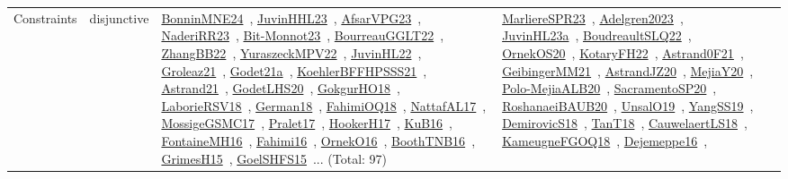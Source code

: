 {\begin{longtable}{lp{3cm}>{\raggedright\arraybackslash}p{6cm}>{\raggedright\arraybackslash}p{6cm}>{\raggedright\arraybackslash}p{8cm}}
Constraints & disjunctive & \href{../works/BonninMNE24.pdf}{BonninMNE24}~\cite{BonninMNE24}, \href{../works/JuvinHHL23.pdf}{JuvinHHL23}~\cite{JuvinHHL23}, \href{../works/AfsarVPG23.pdf}{AfsarVPG23}~\cite{AfsarVPG23}, \href{../works/NaderiRR23.pdf}{NaderiRR23}~\cite{NaderiRR23}, \href{../works/Bit-Monnot23.pdf}{Bit-Monnot23}~\cite{Bit-Monnot23}, \href{../works/BourreauGGLT22.pdf}{BourreauGGLT22}~\cite{BourreauGGLT22}, \href{../works/ZhangBB22.pdf}{ZhangBB22}~\cite{ZhangBB22}, \href{../works/YuraszeckMPV22.pdf}{YuraszeckMPV22}~\cite{YuraszeckMPV22}, \href{../works/JuvinHL22.pdf}{JuvinHL22}~\cite{JuvinHL22}, \href{../works/Groleaz21.pdf}{Groleaz21}~\cite{Groleaz21}, \href{../works/Godet21a.pdf}{Godet21a}~\cite{Godet21a}, \href{../works/KoehlerBFFHPSSS21.pdf}{KoehlerBFFHPSSS21}~\cite{KoehlerBFFHPSSS21}, \href{../works/Astrand21.pdf}{Astrand21}~\cite{Astrand21}, \href{../works/GodetLHS20.pdf}{GodetLHS20}~\cite{GodetLHS20}, \href{../works/GokgurHO18.pdf}{GokgurHO18}~\cite{GokgurHO18}, \href{../works/LaborieRSV18.pdf}{LaborieRSV18}~\cite{LaborieRSV18}, \href{../works/German18.pdf}{German18}~\cite{German18}, \href{../works/FahimiOQ18.pdf}{FahimiOQ18}~\cite{FahimiOQ18}, \href{../works/NattafAL17.pdf}{NattafAL17}~\cite{NattafAL17}, \href{../works/MossigeGSMC17.pdf}{MossigeGSMC17}~\cite{MossigeGSMC17}, \href{../works/Pralet17.pdf}{Pralet17}~\cite{Pralet17}, \href{../works/HookerH17.pdf}{HookerH17}~\cite{HookerH17}, \href{../works/KuB16.pdf}{KuB16}~\cite{KuB16}, \href{../works/FontaineMH16.pdf}{FontaineMH16}~\cite{FontaineMH16}, \href{../works/Fahimi16.pdf}{Fahimi16}~\cite{Fahimi16}, \href{../works/OrnekO16.pdf}{OrnekO16}~\cite{OrnekO16}, \href{../works/BoothTNB16.pdf}{BoothTNB16}~\cite{BoothTNB16}, \href{../works/GrimesH15.pdf}{GrimesH15}~\cite{GrimesH15}, \href{../works/GoelSHFS15.pdf}{GoelSHFS15}~\cite{GoelSHFS15}... (Total: 97) & \href{../works/MarliereSPR23.pdf}{MarliereSPR23}~\cite{MarliereSPR23}, \href{../works/Adelgren2023.pdf}{Adelgren2023}~\cite{Adelgren2023}, \href{../works/JuvinHL23a.pdf}{JuvinHL23a}~\cite{JuvinHL23a}, \href{../works/BoudreaultSLQ22.pdf}{BoudreaultSLQ22}~\cite{BoudreaultSLQ22}, \href{../works/OrnekOS20.pdf}{OrnekOS20}~\cite{OrnekOS20}, \href{../works/KotaryFH22.pdf}{KotaryFH22}~\cite{KotaryFH22}, \href{../works/Astrand0F21.pdf}{Astrand0F21}~\cite{Astrand0F21}, \href{../works/GeibingerMM21.pdf}{GeibingerMM21}~\cite{GeibingerMM21}, \href{../works/AstrandJZ20.pdf}{AstrandJZ20}~\cite{AstrandJZ20}, \href{../works/MejiaY20.pdf}{MejiaY20}~\cite{MejiaY20}, \href{../works/Polo-MejiaALB20.pdf}{Polo-MejiaALB20}~\cite{Polo-MejiaALB20}, \href{../works/SacramentoSP20.pdf}{SacramentoSP20}~\cite{SacramentoSP20}, \href{../works/RoshanaeiBAUB20.pdf}{RoshanaeiBAUB20}~\cite{RoshanaeiBAUB20}, \href{../works/UnsalO19.pdf}{UnsalO19}~\cite{UnsalO19}, \href{../works/YangSS19.pdf}{YangSS19}~\cite{YangSS19}, \href{../works/DemirovicS18.pdf}{DemirovicS18}~\cite{DemirovicS18}, \href{../works/TanT18.pdf}{TanT18}~\cite{TanT18}, \href{../works/CauwelaertLS18.pdf}{CauwelaertLS18}~\cite{CauwelaertLS18}, \href{../works/KameugneFGOQ18.pdf}{KameugneFGOQ18}~\cite{KameugneFGOQ18}, \href{../works/Dejemeppe16.pdf}{Dejemeppe16}~\cite{Dejemeppe16}, 
\end{longtable}}
